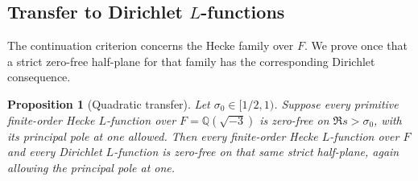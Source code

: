\documentclass[11pt,a4paper]{article}
\numberwithin{equation}{section}
\numberwithin{figure}{section}
\newtheorem{proposition}[theorem]{Proposition}
\theoremstyle{definition}
\theoremstyle{remark}
\begin{document}
\subsection{Transfer to Dirichlet \texorpdfstring{$L$-functions}{L-functions}}

The continuation criterion concerns the Hecke family over $F$.  We prove once that a strict zero-free
half-plane for that family has the corresponding Dirichlet consequence.

\begin{proposition}[Quadratic transfer]
\label{prop:hecke-dirichlet-transfer}
Let $\sigma_0\in[1/2,1)$.  Suppose every primitive finite-order Hecke
$L$-function over $F=\mathbb Q(\sqrt{-3})$ is zero-free on
$\Re s>\sigma_0$, with its principal pole at one allowed.  Then every
finite-order Hecke $L$-function over $F$ and every Dirichlet $L$-function
is zero-free on that same strict half-plane, again allowing the principal
pole at one.
\end{proposition}
\end{document}

